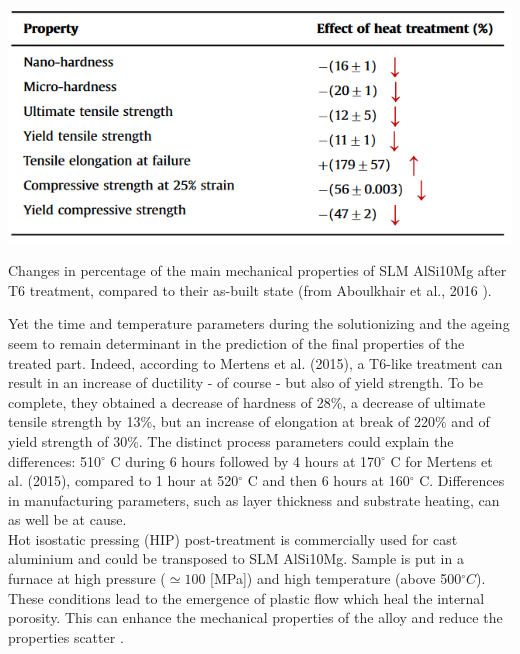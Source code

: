 \begin{table}[ht]
		\centering
			\includegraphics[scale=0.70]{Images/ABvsT6}
			\decoRule
		\caption[Changes in percentage of the main mechanical properties of SLM AlSi10Mg after T6 treatment, , compared to their as-built state]{Changes in percentage of the main mechanical properties of SLM AlSi10Mg after T6 treatment, compared to their as-built state (from Aboulkhair et al., 2016 \parencite{ABOULKHAIR2016139}).}
		\label{tab:ABvsT6}
\end{table}

Yet the time and temperature parameters during the solutionizing and the ageing seem to remain determinant in the prediction of the final properties of the treated part. Indeed, according to Mertens et al. (2015)\cite{Mertens15}, a T6-like treatment can result in an increase of ductility - of course - but also of yield strength. To be complete, they obtained a decrease of hardness of 28\%, a decrease of ultimate tensile strength by 13\%, but an increase of elongation at break of 220\% and of yield strength of 30\%. The distinct process parameters could explain the differences: 510$^\circ$ C during 6 hours followed by 4 hours at 170$^\circ$ C for Mertens et al. (2015)\cite{Mertens15}, compared to 1 hour at 520$^\circ$ C and then 6 hours at 160$^\circ$ C. Differences in manufacturing parameters, such as layer thickness and substrate heating, can as well be at cause.\\

Hot isostatic pressing (HIP) post-treatment is commercially used for cast aluminium and could be transposed to SLM AlSi10Mg. Sample is put in a furnace at high pressure ($\simeq 100$ [MPa]) and high temperature (above 500$^\circ C$). These conditions lead to the emergence of plastic flow which heal the internal porosity. This can enhance the mechanical properties of the alloy and reduce the properties scatter \parencite{HIP}.  \\


